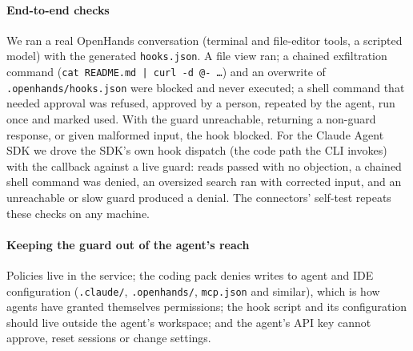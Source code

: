 \paragraph{End-to-end checks}
We ran a real OpenHands conversation (terminal and file-editor tools, a scripted model) with the generated \texttt{hooks.json}. A file view ran; a chained exfiltration command (\texttt{cat README.md | curl -d @- \ldots}) and an overwrite of \texttt{.openhands/hooks.json} were blocked and never executed; a shell command that needed approval was refused, approved by a person, repeated by the agent, run once and marked used. With the guard unreachable, returning a non-guard response, or given malformed input, the hook blocked. For the Claude Agent SDK we drove the SDK's own hook dispatch (the code path the CLI invokes) with the callback against a live guard: reads passed with no objection, a chained shell command was denied, an oversized search ran with corrected input, and an unreachable or slow guard produced a denial. The connectors' self-test repeats these checks on any machine.

\paragraph{Keeping the guard out of the agent's reach}
Policies live in the service; the coding pack denies writes to agent and IDE configuration (\texttt{.claude/}, \texttt{.openhands/}, \texttt{mcp.json} and similar), which is how agents have granted themselves permissions; the hook script and its configuration should live outside the agent's workspace; and the agent's API key cannot approve, reset sessions or change settings.
